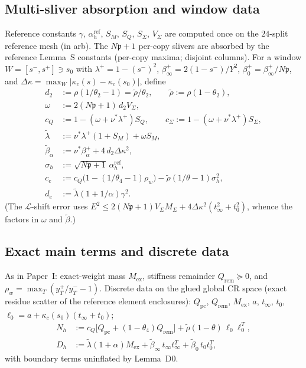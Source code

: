 \documentclass[11pt]{amsart}
\newcommand{\p}{\mathfrak{p}}
\begin{document}
\subsection{Multi-sliver absorption and window data}

Reference constants $\gamma$, $\alpha_h^{\mathrm{ref}}$, $S_M$, $S_Q$,
$S_\Sigma$, $V_\Sigma$ are computed once on the $24$-split reference mesh
(in arb).  The $N\p+1$ per-copy slivers are absorbed by the reference
Lemma~S constants (per-copy maxima; disjoint columns).  For a window
$W=[s^-,s^+]\ni s_0$ with $\lambda^+=1-(s^-)^2$,
$\beta_\infty^+=2(1-s^-)/Y^2$, $\beta_0^+=\beta_\infty^+/N\p$, and
$\Delta\kappa=\max_W|\kappa_c(s)-\kappa_c(s_0)|$, define
\begin{align*}
  d_2&:=\rho(1/\theta_2-1)=\tilde\rho/\theta_2,\qquad
  \tilde\rho:=\rho(1-\theta_2),\\
  \omega&:=2(N\p+1)\,d_2 V_\Sigma,\\
  c_Q&:=1-(\omega+\nu^*\lambda^+)S_Q,\qquad
  c_\Sigma:=1-(\omega+\nu^*\lambda^+)S_\Sigma,\\
  \tilde\lambda&:=\nu^*\lambda^+(1+S_M)+\omega S_M,\\
  \tilde\beta_\alpha&:=\nu^*\beta_\alpha^++4\,d_2\Delta\kappa^2,\\
  \sigma_h&:=\sqrt{N\p+1}\,\alpha_h^{\mathrm{ref}},\\
  c_e&:=c_Q\bigl(1-(1/\theta_4-1)\rho_w\bigr)
    -\tilde\rho(1/\theta-1)\sigma_h^2,\\
  d_e&:=\tilde\lambda(1+1/\alpha)\gamma^2.
\end{align*}
(The $\mathcal{L}$-shift error uses
$E^2\le 2(N\p+1)V_\Sigma M_\Sigma+4\Delta\kappa^2(t_\infty^2+t_0^2)$,
whence the factors in $\omega$ and $\tilde\beta$.)

\subsection{Exact main terms and discrete data}

As in Paper~I: exact-weight mass $M_{\mathrm{ex}}$, stiffness remainder
$Q_{\mathrm{rem}}\succeq 0$, and $\rho_w=\max_T(y_T^+/y_T^--1)$.  Discrete
data on the glued global CR space (exact residue scatter of the
reference element enclosures): $Q_{\mathrm{pc}}$, $Q_{\mathrm{rem}}$,
$M_{\mathrm{ex}}$, $a$, $t_\infty$, $t_0$,
$\ell_0=a+\kappa_c(s_0)(t_\infty+t_0)$;
\begin{align*}
  N_h&:=c_Q\bigl[Q_{\mathrm{pc}}+(1-\theta_4)Q_{\mathrm{rem}}\bigr]
    +\tilde\rho(1-\theta)\,\ell_0\ell_0^T,\\
  D_h&:=\tilde\lambda(1+\alpha)M_{\mathrm{ex}}
    +\tilde\beta_\infty\,t_\infty t_\infty^T
    +\tilde\beta_0\,t_0 t_0^T,
\end{align*}
with boundary terms uninflated by Lemma~D0.
\end{document}
